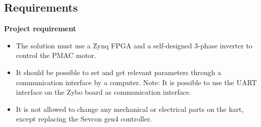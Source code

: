 \subsection{Requirements}

\textbf{Project requirement} \cite{Project 1. semester - S19}

\begin{itemize}
\item The solution must use a Zynq FPGA and a self‐designed 3‐phase inverter to control the PMAC motor.

\item It should be possible to set and get relevant parameters through a communication interface by a computer. Note: It is possible to use the UART interface on the Zybo board as communication interface.

\item It is not allowed to change any mechanical or electrical parts on the kart, except replacing the Sevcon gen4 controller. 
\end{itemize}